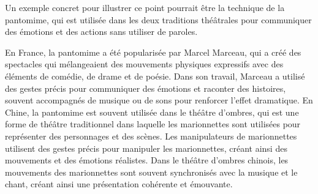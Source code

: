 \documentclass[UTF8,a4paper,12pt]{ctexart}
\numberwithin{equation}{section}
\begin{document}
Un exemple concret pour illustrer ce point pourrait être la technique de la pantomime, qui est utilisée dans les deux traditions théâtrales pour communiquer des émotions et des actions sans utiliser de paroles.

En France, la pantomime a été popularisée par Marcel Marceau, qui a créé des spectacles qui mélangeaient des mouvements physiques expressifs avec des éléments de comédie, de drame et de poésie. Dans son travail, Marceau a utilisé des gestes précis pour communiquer des émotions et raconter des histoires, souvent accompagnés de musique ou de sons pour renforcer l'effet dramatique.
En Chine, la pantomime est souvent utilisée dans le théâtre d'ombres, qui est une forme de théâtre traditionnel dans laquelle les marionnettes sont utilisées pour représenter des personnages et des scènes. Les manipulateurs de marionnettes utilisent des gestes précis pour manipuler les marionnettes, créant ainsi des mouvements et des émotions réalistes. Dans le théâtre d'ombres chinois, les mouvements des marionnettes sont souvent synchronisés avec la musique et le chant, créant ainsi une présentation cohérente et émouvante.
\end{document}
